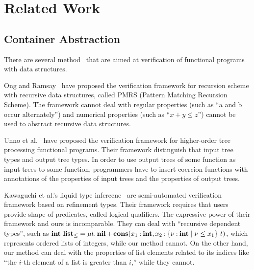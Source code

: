 \section{Related Work}
\label{sec:related}

\subsection{Container Abstraction}
There are several
method~\cite{Kawaguchi2009,Chin2003,Unno2010,Ong2011} that are aimed at
verification of functional programs with data structures.

Ong and Ramsay~\cite{Ong2011} have proposed the verification framework
for recursion scheme with recursive data structures, called PMRS (Pattern
Matching Recursion Scheme).  The framework
cannot deal with regular properties (such as ``a and b occur
alternately'') and numerical properties (such as ``$x+y \leq z$'') cannot be used
to abstract recursive data structures.

Unno et al.~\cite{Unno2010} have proposed the verification framework for higher-order
tree processing functional programs. Their framework distinguish that
input tree types and output tree types.  In order to use output trees of
some function as input trees to some function, programmers have to
insert coercion functions with annotations of the properties of input
trees and the properties of output trees.

Kawaguchi et al.'s liquid type inferecne~\cite{Kawaguchi2009} are
semi-automated verification framework based on refinement types.  Their
framework requires that users provide shape of predicates, called
logical qualifiers.  The expressive power of their framework and ours is
incomparable.  They can deal with ``recursive dependent types'', such as
${\mathbf{int}}~{\mathbf{list}_\leq} = \mu{t}.\, { \mathbf{nil} \mathop{+}
\mathbf{cons}({x_1\mathbin{:}\mathbf{int}},{x_2\mathbin{:}{\{\nu\mathbin{:}\mathbf{int} \mid \nu \leq x_1\}}~{t}})}$,
which represents ordered lists of integers, while our method cannot. On
the other hand, our method can deal with the properties of list elements
related to its indices like ``the $i$-th element of a list is greater
than $i$,'' while they cannot.

